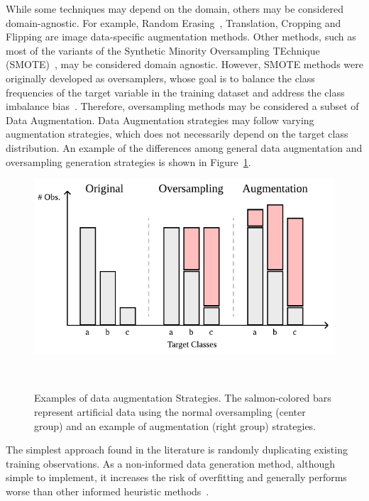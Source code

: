 \documentclass[parskip=full]{scrartcl}
\begin{document}
While some techniques may depend on the domain, others may be considered
domain-agnostic. For example, Random Erasing~\cite{Zhong2020}, Translation,
Cropping and Flipping are image data-specific augmentation methods. Other
methods, such as most of the variants of the Synthetic Minority Oversampling
TEchnique (SMOTE)~\cite{Chawla2002}, may be considered domain agnostic.
However, SMOTE methods were originally developed as oversamplers, whose goal
is to balance the class frequencies of the target variable in the training
dataset and address the class imbalance bias~\cite{Fonseca2021ksmote}.
Therefore, oversampling methods may be considered a subset of Data
Augmentation. Data Augmentation strategies may follow varying augmentation
strategies, which does not necessarily depend on the target class
distribution. An example of the differences among general data augmentation
and oversampling generation strategies is shown in
Figure~\ref{fig:augmentation_strategies}.

\begin{figure}[H]
	\centering
	\includegraphics[width=.6\linewidth]{../analysis/augmentation_strategies}
    \caption{%
        Examples of data augmentation Strategies. The salmon-colored bars
        represent artificial data using the normal oversampling (center group) and
        an example of augmentation (right group) strategies.
    }~\label{fig:augmentation_strategies}
\end{figure}

The simplest approach found in the literature is randomly duplicating existing
training observations. As a non-informed data generation method, although
simple to implement, it increases the risk of overfitting and generally
performs worse than other informed heuristic
methods~\cite{Douzas2019imbalanced}.
\end{document}
